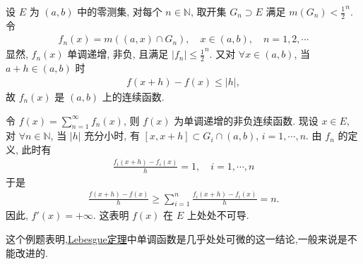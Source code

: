 \documentclass[../../main.tex]{subfiles}%
\begin{document}
\begin{example}
设 $E$ 为 $(a,b)$ 中的零测集, 对每个 $n\in\mathbb{N}$, 取开集 $G_n\supset E$ 满足 $m(G_n)<\frac{1}{2}^n$. 令
\begin{align*}
f_n(x) = m((a,x)\cap G_n),\quad x\in(a,b),\quad n=1,2,\cdots
\end{align*}
显然, $f_n(x)$ 单调递增, 非负, 且满足 $|f_n|\leqslant \frac{1}{2}^n$. 又对 $\forall x\in(a,b)$, 当 $a+h\in(a,b)$ 时
\begin{align*}
f(x+h)-f(x)\leqslant |h|,
\end{align*}
故 $f_n(x)$ 是 $(a,b)$ 上的连续函数.

令 $f(x)=\sum_{n=1}^\infty f_n(x)$, 则 $f(x)$ 为单调递增的非负连续函数. 现设 $x\in E$, 对 $\forall n\in\mathbb{N}$, 当 $|h|$ 充分小时, 有 $[x,x+h]\subset G_i\cap(a,b)$, $i=1,\cdots,n$. 由 $f_n$ 的定义, 此时有
\begin{align*}
\frac{f_i(x+h)-f_i(x)}{h}=1,\quad i=1,\cdots,n
\end{align*}
于是
\begin{align*}
\frac{f(x+h)-f(x)}{h}\geqslant\sum_{i=1}^n\frac{f_i(x+h)-f_i(x)}{h}=n.
\end{align*}
因此, $f'(x)=+\infty$. 这表明 $f(x)$ 在 $E$ 上处处不可导.
\end{example}
\begin{remark}
这个例题表明,\hyperref[theorem:Lebesgue定理--实变函数]{Lebesgue定理}中单调函数是几乎处处可微的这一结论,一般来说是不能改进的.
\end{remark}
\end{document}
